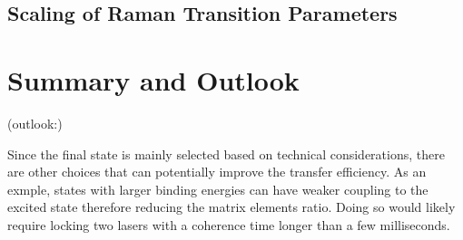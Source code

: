 \subsection{Scaling of Raman Transition Parameters}
\label{ch:raman-transfer:results:scaling}


\section{Summary and Outlook}
\label{ch:raman-transfer:summary}



(outlook:)

Since the final state is mainly selected based on technical considerations,
there are other choices that can potentially improve the transfer efficiency.
As an exmple, states with larger binding energies can have weaker coupling
to the excited state therefore reducing the matrix elements ratio.
Doing so would likely require locking two lasers with a coherence time
longer than a few milliseconds.

